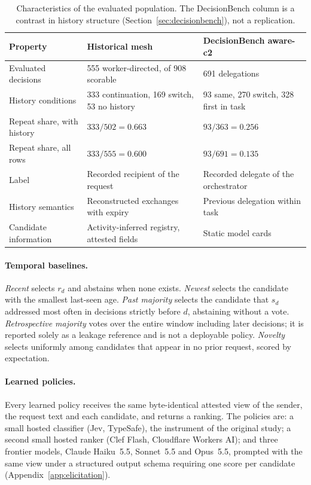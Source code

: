 \documentclass[11pt]{article}
\theoremstyle{definition}
\begin{document}
\begin{table}[t]
\centering\footnotesize
\caption{Characteristics of the evaluated population. The DecisionBench column is a contrast in history structure (Section~\ref{sec:decisionbench}), not a replication.}
\label{tab:population}
\begin{tabular}{lll}
\toprule
Property & Historical mesh & DecisionBench aware-c2 \\
\midrule
Evaluated decisions & 555 worker-directed, of 908 scorable & 691 delegations \\
History conditions & 333 continuation, 169 switch, 53 no history & 93 same, 270 switch, 328 first in task \\
Repeat share, with history & $333/502 = 0.663$ & $93/363 = 0.256$ \\
Repeat share, all rows & $333/555 = 0.600$ & $93/691 = 0.135$ \\
Label & Recorded recipient of the request & Recorded delegate of the orchestrator \\
History semantics & Reconstructed exchanges with expiry & Previous delegation within task \\
Candidate information & Activity-inferred registry, attested fields & Static model cards \\
\bottomrule
\end{tabular}
\end{table}

\paragraph{Temporal baselines.}
\emph{Recent} selects $r_d$ and abstains when none exists. \emph{Newest} selects the candidate with the smallest last-seen age. \emph{Past majority} selects the candidate that $s_d$ addressed most often in decisions strictly before $d$, abstaining without a vote. \emph{Retrospective majority} votes over the entire window including later decisions; it is reported solely as a leakage reference and is not a deployable policy. \emph{Novelty} selects uniformly among candidates that appear in no prior request, scored by expectation.

\paragraph{Learned policies.}
Every learned policy receives the same byte-identical attested view of the sender, the request text and each candidate, and returns a ranking. The policies are: a small hosted classifier (Jev, TypeSafe), the instrument of the original study; a second small hosted ranker (Clef Flash, Cloudflare Workers AI); and three frontier models, Claude Haiku~5.5, Sonnet~5.5 and Opus~5.5, prompted with the same view under a structured output schema requiring one score per candidate (Appendix~\ref{app:elicitation}).
\end{document}
